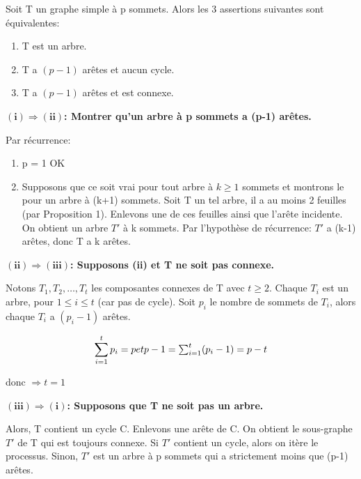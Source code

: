 \begin{thrm}[\textcolor{red}{ATTENTION! Ce théorème et sa démonstration font partie de ceux à connaitre par coeur à l'examen! (pour l'année 2015-2016)}]
Soit T un graphe simple à p sommets. Alors les 3 assertions suivantes sont équivalentes:
	\begin{enumerate}[i]
		\item T est un arbre.
		\item T a $(p-1)$ arêtes et aucun cycle.
		\item T a $(p-1)$ arêtes et est connexe.
	\end{enumerate}
\end{thrm}

\begin{demo}

$\mathbf{(i) \Rightarrow (ii)}$\textbf{: Montrer qu'un arbre à p sommets a (p-1) arêtes.}

	Par récurrence:
		\begin{enumerate}
			\item p = 1 OK 
			\item Supposons que ce soit vrai pour tout arbre à $ k \geq 1$ sommets et montrons le pour un arbre à (k+1) sommets. Soit T un tel arbre, il a au moins 2 feuilles (par Proposition 1). Enlevons une de ces feuilles ainsi que l'arête incidente. On obtient un arbre ${T}'$ à k sommets. Par l’hypothèse de récurrence: ${T}'$ a (k-1) arêtes, donc T a k arêtes.
		\end{enumerate} 

\hspace{-0.5cm}$\mathbf{(ii) \Rightarrow (iii)}$\textbf{: Supposons (ii) et T ne soit pas connexe.}

	Notons $T_{1}, T_{2},\ldots,T_{t}$ les composantes connexes de T avec $t \geq 2$. Chaque $T_{i}$ est un arbre, pour $1 \leq i \leq t$ (car pas de cycle). Soit $p_{i}$ le nombre de sommets de $T_{i}$, alors chaque $T_{i}$ a $(p_{i}-1)$ arêtes.

	\begin{minipage}{.5\textwidth}
		\[\sum_{i=1}^{t} p_{i} = p$$ et $$p-1 = \sum_{i=1}^{t} (p_{i}-1) = p - t \]
	\end{minipage}
	\begin{minipage}{.5\textwidth}
		donc $\Rightarrow t = 1 $
	\end{minipage}

\hspace{-0.5cm}$\mathbf{(iii) \Rightarrow (i)}$\textbf{: Supposons que T ne soit pas un arbre.}

	Alors, T contient un cycle C. Enlevons une arête de C. On obtient le sous-graphe ${T}'$ de T qui est toujours connexe. Si ${T}'$ contient un cycle, alors on itère le processus. Sinon, ${T}'$ est un arbre à p sommets qui a strictement moins que (p-1) arêtes.
		
\end{demo}

